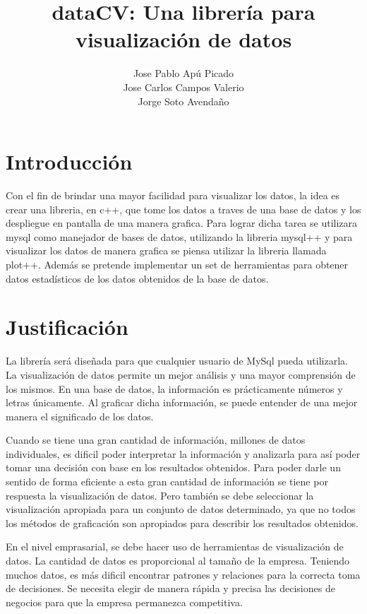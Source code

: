 \documentclass[a4paper,titlepage]{article}
\title{dataCV: Una librería para visualización de datos}
\author{Jose Pablo Apú Picado \\
		Jose Carlos Campos Valerio \\
        Jorge Soto Avendaño}
\begin{document}
\maketitle

\section{Introducción}

Con el fin de brindar una mayor facilidad para visualizar los datos, 
la idea es crear una libreria, en c++, que tome los datos a traves de una 
base de datos y los despliegue en pantalla de una manera grafica. Para lograr 
dicha tarea se utilizara mysql como manejador de bases de datos, utilizando 
la libreria mysql++ y para visualizar los datos de manera grafica se piensa 
utilizar la libreria llamada plot++. Además se pretende implementar un set 
de herramientas para obtener datos estadísticos de los datos obtenidos de la base de datos. 

\section{Justificación}

La librería será diseñada para que cualquier usuario de MySql pueda utilizarla.
La visualización de datos permite un mejor análisis y una mayor comprensión 
de los mismos. En una base de datos, la información es prácticamente números 
y letras únicamente. Al graficar dicha información, se puede entender de una mejor
manera el significado de los datos.

Cuando se tiene una gran cantidad de información, millones de datos individuales, 
es dificil poder interpretar la información y analizarla para así poder tomar
una decisión con base en los resultados obtenidos. Para poder darle un sentido
de forma eficiente a esta gran cantidad de información se tiene por respuesta 
la visualización de datos. Pero también se debe seleccionar la visualización
apropiada para un conjunto de datos determinado, ya que no todos los métodos 
de graficación son apropiados para describir los resultados obtenidos.\cite{oreilly} 

En el nivel emprasarial, se debe hacer uso de herramientas de visualización de datos.
La cantidad de datos es proporcional al tamaño de la empresa. Teniendo muchos datos, 
es más dificil encontrar patrones y relaciones para la correcta toma de decisiones. 
Se necesita elegir de manera rápida y precisa las decisiones de negocios para que 
la empresa permanezca competitiva.\cite{dundas}
\end{document}
